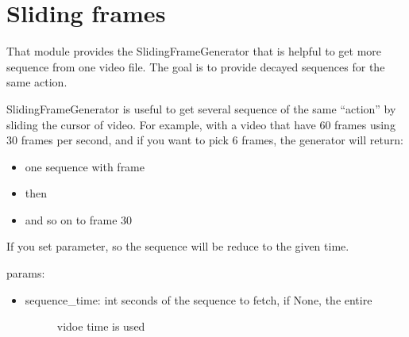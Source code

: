 \documentclass[letterpaper,10pt,english]{sphinxmanual}
\begin{document}
\label{\detokenize{index:module-keras_video.sliding}}

\chapter{Sliding frames}
\label{\detokenize{index:sliding-frames}}
That module provides the SlidingFrameGenerator that is helpful
to get more sequence from one video file. The goal is to provide decayed
sequences for the same action.

\begin{fulllineitems}
\label{\detokenize{index:keras_video.sliding.SlidingFrameGenerator}}
SlidingFrameGenerator is useful to get several sequence of
the same “action” by sliding the cursor of video. For example, with a
video that have 60 frames using 30 frames per second, and if you want
to pick 6 frames, the generator will return:
\begin{itemize}
\item {} 
one sequence with frame \sphinxtitleref{{[} 0,  5, 10, 15, 20, 25{]}}

\item {} 
then \sphinxtitleref{{[} 1,  6, 11, 16, 21, 26{]})}

\item {} 
and so on to frame 30

\end{itemize}

If you set  parameter, so the sequence will be reduce to
the given time.

params:
\begin{itemize}
\item {} \begin{description}
\item[{sequence\_time: int seconds of the sequence to fetch, if None, the entire}] \leavevmode
vidoe time is used

\end{description}

\end{itemize}


\end{fulllineitems}
\end{document}
